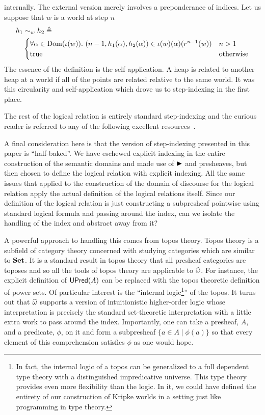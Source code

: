 internally. The external version merely involves a preponderance of
indices. Let us suppose that $w$ is a world at step $n$
\begin{align*}
  h_1 &{}\sim_w h_2 \mathrel{\triangleq}\\
  &\begin{cases}
    \forall \alpha \in \operatorname{Dom}(\iota(w)).\ (n - 1, h_1(\alpha), h_2(\alpha)) \in \iota(w)(\alpha)(r^{n - 1}(w))
    & n > 1\\
    \text{true} & \text{otherwise}
  \end{cases}
\end{align*}
The essence of the definition is the self-application. A heap is
related to another heap at a world if all of the points are related
relative to the same world. It was this circularity and
self-application which drove us to step-indexing in the first place.

The rest of the logical relation is entirely standard step-indexing
and the curious reader is referred to any of the following excellent
resources~\citet{TODO-STEP-INDEXING}.

A final consideration here is that the version of step-indexing
presented in this paper is ``half-baked''. We have eschewed explicit
indexing in the entire construction of the semantic domains and made
use of ${\blacktriangleright}$ and presheaves, but then chosen to define the logical
relation with explicit indexing. All the same issues that applied to
the construction of the domain of discourse for the logical relation
apply the actual definition of the logical relations itself. Since our
definition of the logical relation is just constructing a subpresheaf
pointwise using standard logical formula and passing around the index,
can we isolate the handling of the index and abstract away from it?

A powerful approach to handling this comes from topos theory. Topos
theory is a subfield of category theory concerned with studying
categories which are similar to $\mathbf{Set}$. It is a standard result in
topos theory that all presheaf categories are toposes and so all the
tools of topos theory are applicable to $\widehat{\omega}$. For
instance, the explicit definition of $\mathsf{UPred}(A)$ can be replaced with
the topos theoretic definition of power sets. Of particular interest
is the ``internal logic\footnote{In fact, the internal logic of a
  topos can be generalized to a full dependent type theory with a
  distinguished impredicative universe. This type theory provides even
  more flexibility than the logic. In it, we could have defined the
  entirety of our construction of Kripke worlds in a setting just like
  programming in type theory.}'' of the topos. It turns out that
$\widehat{\omega}$ supports a version of intuitionistic
higher-order logic whose interpretation is precisely the standard
set-theoretic interpretation with a little extra work to pass around
the index. Importantly, one can take a presheaf, $A$, and a predicate,
$\phi$, on it and form a subpresheaf $\{ a \in A \mid \phi(a) \}$ so
that every element of this comprehension satisfies $\phi$ as one would
hope.

